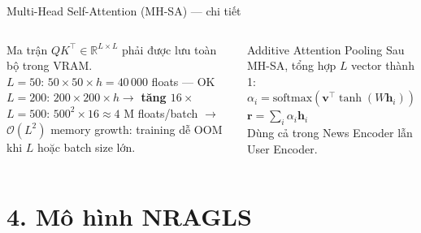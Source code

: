 \documentclass[aspectratio=169,11pt]{beamer}
\newcommand{\faExclamationTriangle}{{\color{accentorange}\textbf{!}}}
\begin{document}
\begin{frame}{Multi-Head Self-Attention (MH-SA) --- chi tiết}
\begin{columns}[T]
      \begin{warnbox}[title={\faExclamationTriangle\ Bottleneck (điểm nghẽn)}]
        \footnotesize
        Ma trận $QK^\top \in \mathbb{R}^{L \times L}$
        phải được lưu toàn bộ trong VRAM.\\[0.3em]
        $L=50$: $50 \times 50 \times h = 40\,000$ floats --- OK\\
        $L=200$: $200 \times 200 \times h \to$ \textbf{tăng $16\times$}\\
        $L=500$: $500^2 \times 16 \approx 4$ M floats/batch
        $\to$ $\mathcal{O}(L^2)$ memory growth:
training dễ OOM khi $L$ hoặc batch size lớn.
      \end{warnbox}
      \vspace{0.2em}
      \begin{exampleblock}{Additive Attention Pooling}
        \footnotesize
        Sau MH-SA, tổng hợp $L$ vector thành 1:\\
        $\alpha_i = \text{softmax}(\mathbf{v}^\top \tanh(W\mathbf{h}_i))$\\
        $\mathbf{r} = \sum_i \alpha_i \mathbf{h}_i$\\[0.2em]
        Dùng cả trong News Encoder lẫn User Encoder.
      \end{exampleblock}
  \end{columns}
\end{frame}

\section{4. Mô hình NRAGLS}
\end{document}
